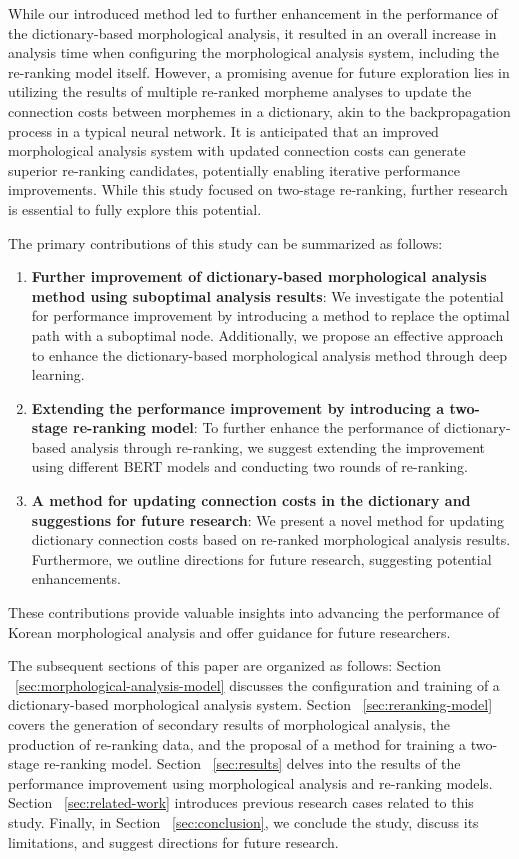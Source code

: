 \documentclass[AMS,STIX2COL]{WileyNJD-v2}
\begin{document}
    While our introduced method led to further enhancement in the performance of the dictionary-based morphological analysis, it resulted in an overall increase in analysis time when configuring the morphological analysis system, including the re-ranking model itself.
    However, a promising avenue for future exploration lies in utilizing the results of multiple re-ranked morpheme analyses to update the connection costs between morphemes in a dictionary, akin to the backpropagation process in a typical neural network.
    It is anticipated that an improved morphological analysis system with updated connection costs can generate superior re-ranking candidates, potentially enabling iterative performance improvements.
    While this study focused on two-stage re-ranking, further research is essential to fully explore this potential.

    The primary contributions of this study can be summarized as follows:
    \begin{enumerate}
        \item \textbf{Further improvement of dictionary-based morphological analysis method using suboptimal analysis results}: We investigate the potential for performance improvement by introducing a method to replace the optimal path with a suboptimal node. Additionally, we propose an effective approach to enhance the dictionary-based morphological analysis method through deep learning.
        \item \textbf{Extending the performance improvement by introducing a two-stage re-ranking model}: To further enhance the performance of dictionary-based analysis through re-ranking, we suggest extending the improvement using different BERT models and conducting two rounds of re-ranking.
        \item \textbf{A method for updating connection costs in the dictionary and suggestions for future research}: We present a novel method for updating dictionary connection costs based on re-ranked morphological analysis results. Furthermore, we outline directions for future research, suggesting potential enhancements.
    \end{enumerate}
    These contributions provide valuable insights into advancing the performance of Korean morphological analysis and offer guidance for future researchers.

    The subsequent sections of this paper are organized as follows:
    Section ~\ref{sec:morphological-analysis-model} discusses the configuration and training of a dictionary-based morphological analysis system.
    Section ~\ref{sec:reranking-model} covers the generation of secondary results of morphological analysis, the production of re-ranking data, and the proposal of a method for training a two-stage re-ranking model.
    Section ~\ref{sec:results} delves into the results of the performance improvement using morphological analysis and re-ranking models.
    Section ~\ref{sec:related-work} introduces previous research cases related to this study.
    Finally, in Section ~\ref{sec:conclusion}, we conclude the study, discuss its limitations, and suggest directions for future research.
\end{document}
